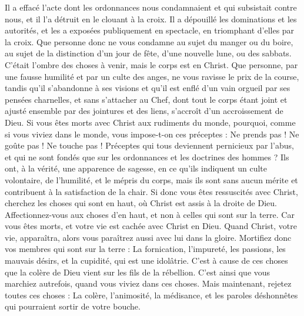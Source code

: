 \begin{multicols}{2}
Il a effacé l’acte dont les ordonnances nous condamnaient et qui subsistait contre nous, et il l’a détruit en le clouant à la croix.
Il a dépouillé les dominations et les autorités, et les a exposées publiquement en spectacle, en triomphant d’elles par la croix.
Que personne donc ne vous condamne au sujet du manger ou du boire, au sujet de la distinction d'un jour de fête, d’une nouvelle lune, ou des sabbats.
C’était l’ombre des choses à venir, mais le corps est en Christ.
Que personne, par une fausse humilité et par un culte des anges, ne vous ravisse le prix de la course, tandis qu’il s’abandonne à ses visions et qu’il est enflé d’un vain orgueil par ses pensées charnelles,
et sans s’attacher au Chef, dont tout le corps étant joint et ajusté ensemble par des jointures et des liens, s’accroît d'un accroissement de Dieu.
Si vous êtes morts avec Christ aux rudiments du monde, pourquoi, comme si vous viviez dans le monde, vous impose-t-on ces préceptes :
Ne prends pas ! Ne goûte pas ! Ne touche pas !
Préceptes qui tous deviennent pernicieux par l’abus, et qui ne sont fondés que sur les ordonnances et les doctrines des hommes ?
Ils ont, à la vérité, une apparence de sagesse, en ce qu’ils indiquent un culte volontaire, de l’humilité, et le mépris du corps, mais ils sont sans aucun mérite et contribuent à la satisfaction de la chair.
\VerseOne{}Si donc vous êtes ressuscités avec Christ, cherchez les choses qui sont en haut, où Christ est assis à la droite de Dieu.
Affectionnez-vous aux choses d’en haut, et non à celles qui sont sur la terre.
Car vous êtes morts, et votre vie est cachée avec Christ en Dieu.
Quand Christ, votre vie, apparaîtra, alors vous paraîtrez aussi avec lui dans la gloire.
Mortifiez donc vos membres qui sont sur la terre : La fornication, l’impureté, les passions, les mauvais désirs, et la cupidité, qui est une idolâtrie.
C’est à cause de ces choses que la colère de Dieu vient sur les fils de la rébellion.
C’est ainsi que vous marchiez autrefois, quand vous viviez dans ces choses.
Mais maintenant, rejetez toutes ces choses : La colère, l'animosité, la médisance, et les paroles déshonnêtes qui pourraient sortir de votre bouche.

\end{multicols}

